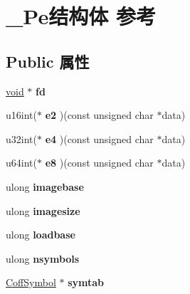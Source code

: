 \hypertarget{struct___pe}{}\section{\+\_\+\+Pe结构体 参考}
\label{struct___pe}
\subsection*{Public 属性}
\begin{DoxyCompactItemize}
\item 
\mbox{\label{struct___pe_a0e29ecc287808d099fd970cec28ca7a2}} 
\hyperlink{interfacevoid}{void} $\ast$ {\bfseries fd}
\item 
\mbox{\label{struct___pe_a5a8975d1dba6e3fb6d9f249d1ecf10ae}} 
u16int($\ast$ {\bfseries e2} )(const unsigned char $\ast$data)
\item 
\mbox{\label{struct___pe_ab3218b05fe81192bcb6d8534b44e0352}} 
u32int($\ast$ {\bfseries e4} )(const unsigned char $\ast$data)
\item 
\mbox{\label{struct___pe_ab1634f40f084f00d9e7042417b9458e2}} 
u64int($\ast$ {\bfseries e8} )(const unsigned char $\ast$data)
\item 
\mbox{\label{struct___pe_ad41caa80d74de609aec194c49f7a5e66}} 
ulong {\bfseries imagebase}
\item 
\mbox{\label{struct___pe_a05e697a0947de3d2d02ebd85aa3730cc}} 
ulong {\bfseries imagesize}
\item 
\mbox{\label{struct___pe_a119818929fd9137d09c58553c47b321e}} 
ulong {\bfseries loadbase}
\item 
\mbox{\label{struct___pe_a8e94ee13f2ef3827721513635fd754ad}} 
ulong {\bfseries nsymbols}
\item 
\mbox{\label{struct___pe_a24c95898e24dc10f830e1e3ee024d3b5}} 
\hyperlink{struct___coff_symbol}{Coff\+Symbol} $\ast$ {\bfseries symtab}
\item 
\mbox{\label{struct___pe_a61a770fee2f2c4abb76fa6882cc73c37}} 

\end{DoxyCompactItemize}
